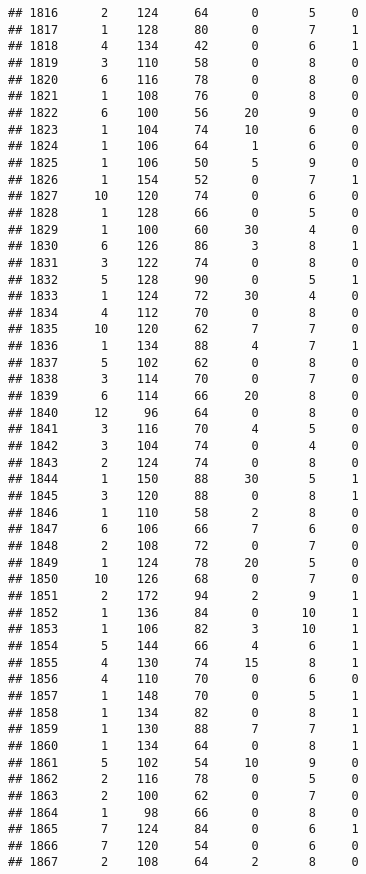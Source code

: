 \documentclass[
]{article}
\begin{document}
\begin{verbatim}
## 1816      2    124     64      0       5     0
## 1817      1    128     80      0       7     1
## 1818      4    134     42      0       6     1
## 1819      3    110     58      0       8     0
## 1820      6    116     78      0       8     0
## 1821      1    108     76      0       8     0
## 1822      6    100     56     20       9     0
## 1823      1    104     74     10       6     0
## 1824      1    106     64      1       6     0
## 1825      1    106     50      5       9     0
## 1826      1    154     52      0       7     1
## 1827     10    120     74      0       6     0
## 1828      1    128     66      0       5     0
## 1829      1    100     60     30       4     0
## 1830      6    126     86      3       8     1
## 1831      3    122     74      0       8     0
## 1832      5    128     90      0       5     1
## 1833      1    124     72     30       4     0
## 1834      4    112     70      0       8     0
## 1835     10    120     62      7       7     0
## 1836      1    134     88      4       7     1
## 1837      5    102     62      0       8     0
## 1838      3    114     70      0       7     0
## 1839      6    114     66     20       8     0
## 1840     12     96     64      0       8     0
## 1841      3    116     70      4       5     0
## 1842      3    104     74      0       4     0
## 1843      2    124     74      0       8     0
## 1844      1    150     88     30       5     1
## 1845      3    120     88      0       8     1
## 1846      1    110     58      2       8     0
## 1847      6    106     66      7       6     0
## 1848      2    108     72      0       7     0
## 1849      1    124     78     20       5     0
## 1850     10    126     68      0       7     0
## 1851      2    172     94      2       9     1
## 1852      1    136     84      0      10     1
## 1853      1    106     82      3      10     1
## 1854      5    144     66      4       6     1
## 1855      4    130     74     15       8     1
## 1856      4    110     70      0       6     0
## 1857      1    148     70      0       5     1
## 1858      1    134     82      0       8     1
## 1859      1    130     88      7       7     1
## 1860      1    134     64      0       8     1
## 1861      5    102     54     10       9     0
## 1862      2    116     78      0       5     0
## 1863      2    100     62      0       7     0
## 1864      1     98     66      0       8     0
## 1865      7    124     84      0       6     1
## 1866      7    120     54      0       6     0
## 1867      2    108     64      2       8     0

\end{verbatim}
\end{document}
